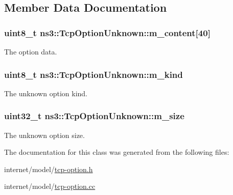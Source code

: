 \subsection{Member Data Documentation}
\subsubsection[{\texorpdfstring{m\+\_\+content}{m_content}}]{\setlength{\rightskip}{0pt plus 5cm}uint8\+\_\+t ns3\+::\+Tcp\+Option\+Unknown\+::m\+\_\+content\mbox{[}40\mbox{]}\hspace{0.3cm}{\ttfamily [private]}}\hypertarget{classns3_1_1TcpOptionUnknown_a49b2d0b68ff00f9cde157668a1919dd6}{}\label{classns3_1_1TcpOptionUnknown_a49b2d0b68ff00f9cde157668a1919dd6}


The option data. 

\subsubsection[{\texorpdfstring{m\+\_\+kind}{m_kind}}]{\setlength{\rightskip}{0pt plus 5cm}uint8\+\_\+t ns3\+::\+Tcp\+Option\+Unknown\+::m\+\_\+kind\hspace{0.3cm}{\ttfamily [private]}}\hypertarget{classns3_1_1TcpOptionUnknown_af15ae7505e75e27cae9c3f34b0cd0e4d}{}\label{classns3_1_1TcpOptionUnknown_af15ae7505e75e27cae9c3f34b0cd0e4d}


The unknown option kind. 

\subsubsection[{\texorpdfstring{m\+\_\+size}{m_size}}]{\setlength{\rightskip}{0pt plus 5cm}uint32\+\_\+t ns3\+::\+Tcp\+Option\+Unknown\+::m\+\_\+size\hspace{0.3cm}{\ttfamily [private]}}\hypertarget{classns3_1_1TcpOptionUnknown_aaa1ad72446d548a9f3a6eb1ab306e7dc}{}\label{classns3_1_1TcpOptionUnknown_aaa1ad72446d548a9f3a6eb1ab306e7dc}


The unknown option size. 



The documentation for this class was generated from the following files\+:\begin{DoxyCompactItemize}
\item 
internet/model/\hyperlink{tcp-option_8h}{tcp-\/option.\+h}\item 
internet/model/\hyperlink{tcp-option_8cc}{tcp-\/option.\+cc}\end{DoxyCompactItemize}
